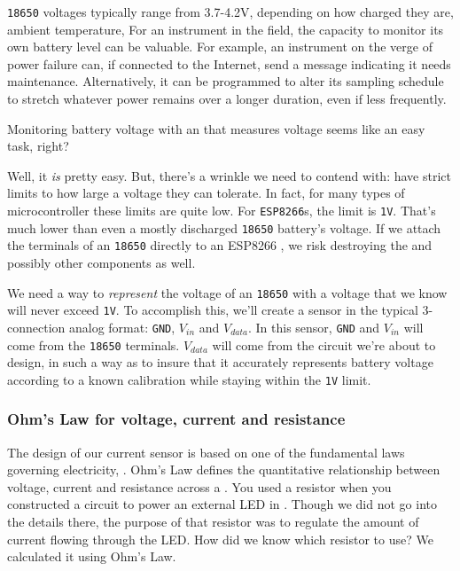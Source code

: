 \texttt{18650} voltages typically range from 3.7-4.2V, depending on how charged they are, ambient temperature, \etc
For an instrument in the field, the capacity to monitor its own battery level can be valuable.
For example, an instrument on the verge of power failure can, if connected to the Internet, send a message indicating it needs maintenance.
Alternatively, it can be programmed to alter its sampling schedule to stretch whatever power remains over a longer duration, even if less frequently.

Monitoring battery voltage with an \adc that measures voltage seems like an easy task, right?

Well, it \emph{is} pretty easy.
But, there's a wrinkle we need to contend with: \adcs have strict limits to how large a voltage they can tolerate.
In fact, for many types of microcontroller these limits are quite low.
For \texttt{ESP8266}s, the limit is \texttt{1V}.
That's much lower than even a mostly discharged \texttt{18650} battery's voltage.
If we attach the terminals of an \texttt{18650} directly to an ESP8266 \adc, we risk destroying the \adc and possibly other components as well.

We need a way to \emph{represent} the voltage of an \texttt{18650} with a voltage that we know will never exceed \texttt{1V}.
To accomplish this, we'll create a sensor in the typical 3-connection analog format: \texttt{GND}, $V_{in}$ and $V_{data}$.
In this sensor, \texttt{GND} and $V_{in}$ will come from the \texttt{18650} terminals.
$V_{data}$ will come from the circuit we're about to design, in such a way as to insure that it accurately represents battery voltage according to a known calibration while staying within the \texttt{1V} limit.

\subsubsection{Ohm's Law for voltage, current and resistance}
The design of our current sensor is based on one of the fundamental laws governing electricity, .
Ohm's Law defines the quantitative relationship between voltage, current and resistance across a .
You used a resistor when you constructed a circuit to power an external LED in .
Though we did not go into the details there, the purpose of that resistor was to regulate the amount of current flowing through the LED.
How did we know which resistor to use?
We calculated it using Ohm's Law.

